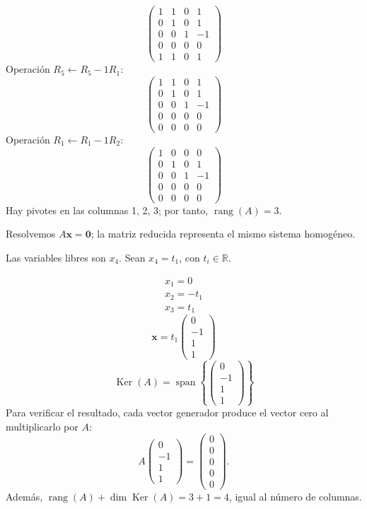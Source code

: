 \documentclass[12pt]{article}
\theoremstyle{remark}
\newcommand{\rang}{\operatorname{rang}}
\newcommand{\Ker}{\operatorname{Ker}}
\newcommand{\vect}[1]{\boldsymbol{#1}}
\begin{document}
\[
\begin{pmatrix}1&1&0&1\\0&1&0&1\\0&0&1&-1\\0&0&0&0\\1&1&0&1\end{pmatrix}
\]
Operación $R_{5}\leftarrow R_{5}-1R_{1}$:
\[
\begin{pmatrix}1&1&0&1\\0&1&0&1\\0&0&1&-1\\0&0&0&0\\0&0&0&0\end{pmatrix}
\]
Operación $R_{1}\leftarrow R_{1}-1R_{2}$:
\[
\begin{pmatrix}1&0&0&0\\0&1&0&1\\0&0&1&-1\\0&0&0&0\\0&0&0&0\end{pmatrix}
\]
Hay pivotes en las columnas 1, 2, 3; por tanto, $\boxed{\rang(A)=3}$.

Resolvemos $A\vect x=\vect0$; la matriz reducida representa el mismo sistema homogéneo.

Las variables libres son $x_{4}$. Sean $x_{4}=t_{1}$, con $t_i\in\mathbb R$.

\[
\begin{aligned}x_{1}=0\\x_{2}=- t_{1}\\x_{3}=t_{1}\end{aligned}
\]
\[
\vect x=t_{1}\begin{pmatrix}0\\-1\\1\\1\end{pmatrix}
\]
\[
\boxed{\Ker(A)=\operatorname{span}\left\{\begin{pmatrix}0\\-1\\1\\1\end{pmatrix}\right\}}
\]
Para verificar el resultado, cada vector generador produce el vector cero al multiplicarlo por $A$:
\[
A\begin{pmatrix}0\\-1\\1\\1\end{pmatrix}=\begin{pmatrix}0\\0\\0\\0\\0\end{pmatrix}.
\]
Además, $\rang(A)+\dim\Ker(A)=3+1=4$, igual al número de columnas.
\end{document}
